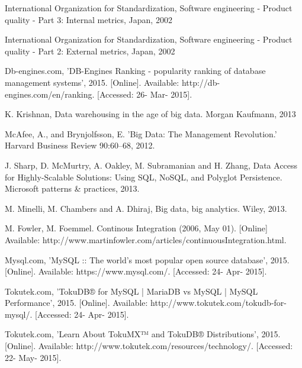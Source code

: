 \begin{thebibliography}{69}
 International Organization for Standardization, Software engineering - Product quality - Part 3: Internal metrics, Japan, 2002

 International Organization for Standardization, Software engineering - Product quality - Part 2: External metrics, Japan, 2002   

 Db-engines.com, 'DB-Engines Ranking - popularity ranking of database management systems', 2015. [Online]. Available: http://db-engines.com/en/ranking. [Accessed: 26- Mar- 2015].



 K. Krishnan, Data warehousing in the age of big data. Morgan Kaufmann, 2013

 McAfee, A., and Brynjolfsson, E. 'Big Data: The Management Revolution.' Harvard Business Review 90:60–68, 2012.

 J.  Sharp, D.  McMurtry, A.  Oakley, M.  Subramanian and H.  Zhang, Data Access for Highly-Scalable Solutions: Using SQL, NoSQL, and Polyglot Persistence. Microsoft patterns \& practices, 2013.

M. Minelli, M. Chambers and A. Dhiraj, Big data, big analytics. Wiley, 2013. 


 M. Fowler, M. Foemmel. Continous Integration (2006, May 01). [Online] Available: http://www.martinfowler.com/articles/continuousIntegration.html. 

 Mysql.com, 'MySQL ::  The world's most popular open source database', 2015. [Online]. Available: https://www.mysql.com/. [Accessed: 24- Apr- 2015].

 Tokutek.com, 'TokuDB® for MySQL | MariaDB vs MySQL | MySQL Performance', 2015. [Online]. Available: http://www.tokutek.com/tokudb-for-mysql/. [Accessed: 24- Apr- 2015].

 Tokutek.com, 'Learn About TokuMX™ and TokuDB® Distributions', 2015. [Online]. Available: http://www.tokutek.com/resources/technology/. [Accessed: 22- May- 2015].


\end{thebibliography}
